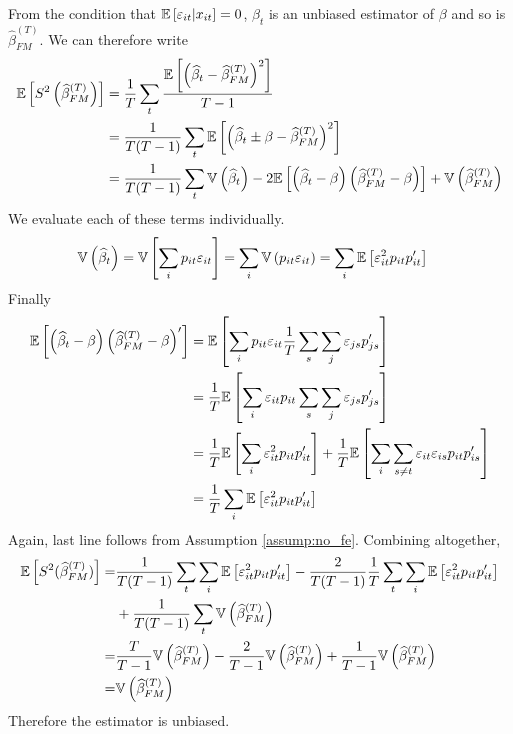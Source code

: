 \documentclass[12pt,twoside]{article}
\begin{document}
\begin{enumerate}[label = (\alph*)]
\begin{solution}
        From the condition that \(\mathbb{E}\left[\varepsilon_{it}\vert x_{it}\right] = 0\), \(\widehat\beta_t\) is an unbiased estimator of \(\beta\) and so is  \(\widehat\beta^{(T)}_{FM}\). We can therefore write
        \begin{equation}
            \begin{aligned}
                \label{eq:fm_variance}
            \mathbb{E}\left[S^2\left(\widehat\beta^{(T)}_{FM}\right)\right] & = \frac{1}{T} \sum_t \frac{\mathbb{E}\left[\left(\widehat\beta_t - \widehat\beta^{ (T)}_{FM}\right)^2\right]}{T-1} \\
            & = \frac{1}{T(T-1)} \sum_t \mathbb{E}\left[\left(\widehat\beta_t \pm \beta - \widehat\beta^{ (T)}_{FM}\right)^2\right] \\ 
            & = \frac{1}{T(T-1)}\sum_t \mathbb{V}\left(\widehat\beta_t\right) -  2\mathbb{E}\left[\left(\widehat\beta_t - \beta\right)\left(\widehat\beta^{(T)}_{FM}-\beta\right)\right] + \mathbb{V}\left(\widehat\beta^{(T)}_{FM}\right)
            \end{aligned}
        \end{equation}
        We evaluate each of these terms individually.
        \begin{align*}
            \mathbb{V}\left(\widehat\beta_t\right) & = \mathbb{V}\left[\sum_i p_{it}\varepsilon_{it}\right] = \sum_i\mathbb{V}\left(p_{it}\varepsilon_{it}\right) = \sum_i\mathbb{E}\left[\varepsilon_{it}^2p_{it}p_{it}^\prime\right] 
        \end{align*}
        Finally
        \begin{align*}
            \mathbb{E}\left[\left(\widehat\beta_t-\beta\right)\left(\widehat\beta^{(T)}_{FM}-\beta\right)^\prime\right] & = \mathbb{E}\left[\sum_ip_{it}\varepsilon_{it}\frac{1}{T}\sum_s\sum_j\varepsilon_{js}p_{js}^\prime\right] \\
            & = \frac{1}{T}\mathbb{E}\left[\sum_i \varepsilon_{it}p_{it}\sum_s\sum_j\varepsilon_{js}p_{js}^\prime\right] \\
            & = \frac{1}{T}\mathbb{E}\left[\sum_i \varepsilon_{it}^2p_{it}p_{it}^\prime\right] + \frac{1}{T}\mathbb{E}\left[\sum_i\sum_{s \neq t}\varepsilon_{it}\varepsilon_{is}p_{it}p_{is}^\prime\right] \\
            & = \frac{1}{T}\sum_i\mathbb{E}\left[\varepsilon_{it}^2p_{it}p_{it}^\prime\right]
        \end{align*}
        Again, last line follows from Assumption \ref{assump:no_fe}. Combining altogether,
        \begin{align*}
            \tiny
            \mathbb{E}\left[S^2(\widehat\beta^{(T)}_{FM})\right] = & \frac{1}{T(T-1)}\sum_t\sum_i\mathbb{E}\left[\varepsilon_{it}^2p_{it}p_{it}^\prime\right]  - \frac{2}{T(T-1)}\frac{1}{T}\sum_t\sum_i \mathbb{E}\left[\varepsilon_{it}^2p_{it}p_{it}^\prime\right] \\ & + \frac{1}{T(T-1)}\sum_t\mathbb{V}\left(\widehat\beta^{(T)}_{FM}\right) \\ 
            = & \frac{T}{T-1}\mathbb{V}\left(\widehat\beta^{(T)}_{FM}\right) - \frac{2}{T-1}\mathbb{V}\left(\widehat\beta^{(T)}_{FM}\right) + \frac{1}{T-1}\mathbb{V}\left(\widehat\beta^{(T)}_{FM}\right) \\
            = & \mathbb{V}\left(\widehat\beta^{(T)}_{FM}\right)
        \end{align*}
        Therefore the estimator is unbiased.


\end{solution}
\end{enumerate}
\end{document}
